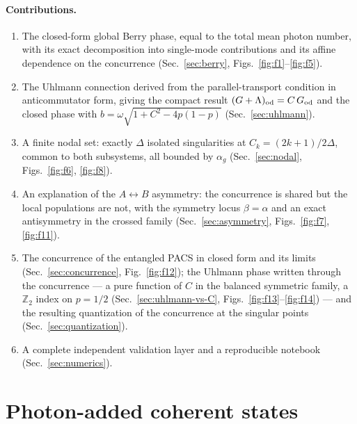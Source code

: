 \documentclass[11pt]{article}
\begin{document}
\paragraph{Contributions.}
\begin{enumerate}[label=(\roman*)]
\item The closed-form global Berry phase, equal to the total mean photon
      number, with its exact decomposition into single-mode contributions and
      its affine dependence on the concurrence
      (Sec.~\ref{sec:berry}, Figs.~\ref{fig:f1}--\ref{fig:f5}).
\item The Uhlmann connection derived from the parallel-transport condition in
      anticommutator form, giving the compact result
      $(G+\Lambda)_{\rm od}=C\,G_{\rm od}$ and the closed phase with
      $b=\omega\sqrt{1+C^2-4p(1-p)}$ (Sec.~\ref{sec:uhlmann}).
\item A finite nodal set: exactly $\Delta$ isolated singularities at
      $C_k=(2k+1)/2\Delta$, common to both subsystems, all bounded by
      $\alpha_g$ (Sec.~\ref{sec:nodal}, Figs.~\ref{fig:f6}, \ref{fig:f8}).
\item An explanation of the $A\leftrightarrow B$ asymmetry: the concurrence is
      shared but the local populations are not, with the symmetry locus
      $\beta=\alpha$ and an exact antisymmetry in the crossed family
      (Sec.~\ref{sec:asymmetry}, Figs.~\ref{fig:f7}, \ref{fig:f11}).
\item The concurrence of the entangled PACS in closed form and its limits
      (Sec.~\ref{sec:concurrence}, Fig.~\ref{fig:f12}); the Uhlmann phase
      written through the concurrence --- a pure function of $C$ in the
      balanced symmetric family, a $\mathbb{Z}_2$ index on $p=1/2$
      (Sec.~\ref{sec:uhlmann-vs-C}, Figs.~\ref{fig:f13}--\ref{fig:f14}) ---
      and the resulting quantization of the concurrence at the singular points
      (Sec.~\ref{sec:quantization}).
\item A complete independent validation layer and a reproducible notebook
      (Sec.~\ref{sec:numerics}).
\end{enumerate}

\section{Photon-added coherent states}
\label{sec:pacs}
\end{document}
